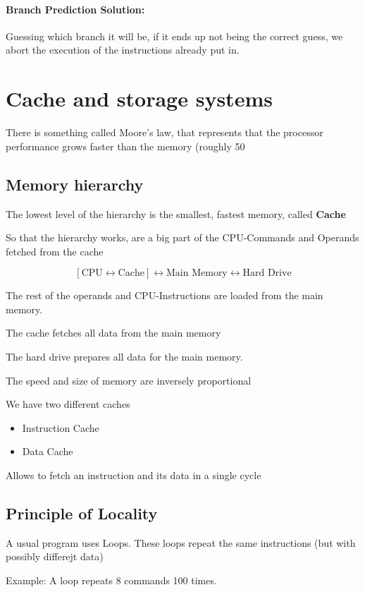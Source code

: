 \documentclass{article}
\begin{document}
\paragraph{ Branch Prediction Solution: } Guessing which branch it will be, if it ends up not being the correct guess, we abort the execution of the instructions already put in.

\section{Cache and storage systems}


There is something called Moore's law, that represents that the processor performance grows faster than the memory (roughly 50%

\subsection{Memory hierarchy}

The lowest level of the hierarchy is the smallest, fastest memory, called \textbf{Cache}

So that the hierarchy works, are a big part of the CPU-Commands and Operands fetched from the cache


\[ [\text{CPU} \leftrightarrow \text{Cache}] \leftrightarrow \text{Main Memory} \leftrightarrow \text{Hard Drive}\]

The rest of the operands and CPU-Instructions are loaded from the main memory.

The cache fetches all data from the main memory

The hard drive prepares all data for the main memory.


The speed and size of memory are inversely proportional


We have two different caches
\begin{itemize}
  \item Instruction Cache
  \item Data Cache
\end{itemize}
Allows to fetch an instruction and its data in a single cycle


\subsection{Principle of Locality}
A usual program uses Loops. These loops repeat the same instructions (but with possibly differejt data)


Example: A loop repeats 8 commands 100 times.
\end{document}
